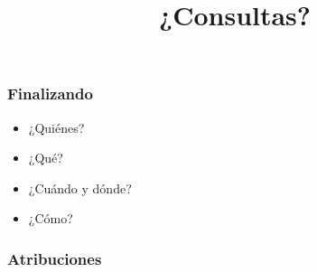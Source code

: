 \documentclass[11pt,a4paper,spanish]{beamer}
\begin{document}
\begin{frame}

    \frametitle{Finalizando}

\begin{itemize}

\item ¿Quiénes?

\item ¿Qué?

\item ¿Cuándo y dónde?

\item ¿Cómo?

\end{itemize}

\end{frame}

\begin{frame}

\title{¿Consultas?}
\maketitle

\end{frame}

\setcounter{lastPage}{\number\value{page}}

\begin{frame}%

\frametitle{Atribuciones}


\tiny

\end{frame}

\setcounter{page}{\number\value{lastPage}}
\end{document}
